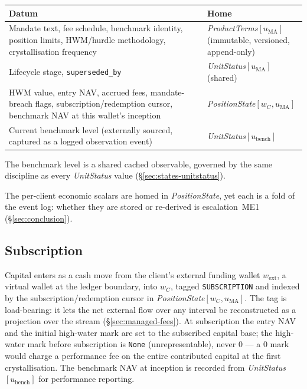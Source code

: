 \documentclass[11pt,a4paper]{article}
\begin{document}
\begin{longtable}{p{8.0cm}p{6.4cm}}
\toprule
\textbf{Datum} & \textbf{Home} \\
\midrule
Mandate text, fee schedule, benchmark identity, position limits, HWM/hurdle methodology,
crystallisation frequency & \textit{ProductTerms}$[u_{\mathrm{MA}}]$ (immutable, versioned,
append-only) \\
Lifecycle stage, \texttt{superseded\_by} & \textit{UnitStatus}$[u_{\mathrm{MA}}]$ (shared) \\
HWM value, entry NAV, accrued fees, mandate-breach flags, subscription/redemption cursor,
benchmark NAV at this wallet's inception & \textit{PositionState}$[w_C,u_{\mathrm{MA}}]$ \\
Current benchmark level (externally sourced, captured as a logged observation event) &
\textit{UnitStatus}$[u_{\mathrm{bench}}]$ \\
\bottomrule
\end{longtable}

The benchmark level is a shared cached observable, governed by the same discipline as every
\textit{UnitStatus} value (\S\ref{sec:states-unitstatus}).

The per-client economic scalars are homed in \textit{PositionState}, yet each is a fold of the
event log: whether they are stored or re-derived is escalation~ME1 (\S\ref{sec:conclusion}).

\subsection{Subscription}
\label{sec:managed-subscription}

Capital enters as a cash move from the client's external funding wallet $w_{\text{ext}}$, a
virtual wallet at the ledger boundary, into $w_C$, tagged \texttt{SUBSCRIPTION} and indexed by the
subscription/redemption cursor in \textit{PositionState}$[w_C,u_{\mathrm{MA}}]$. The tag is
load-bearing: it lets the net external flow over any interval be reconstructed as a projection
over the stream (\S\ref{sec:managed-fees}). At subscription the entry NAV and the initial high-water
mark are set to the subscribed capital base; the high-water mark before subscription is
\texttt{None} (unrepresentable), never $0$ --- a $0$ mark would charge a performance fee on the
entire contributed capital at the first crystallisation. The benchmark NAV at inception is
recorded from \textit{UnitStatus}$[u_{\mathrm{bench}}]$ for performance reporting.
\end{document}
